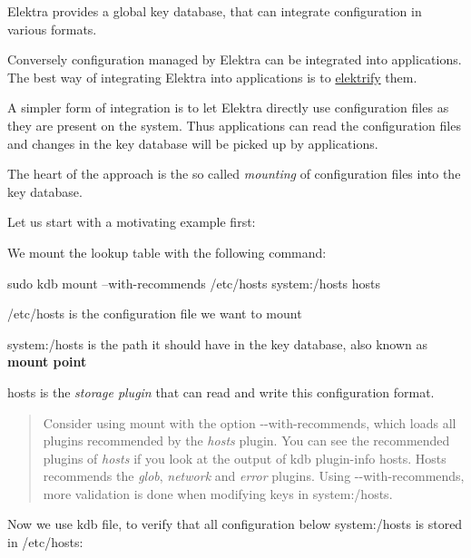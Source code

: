 Elektra provides a global key database, that can integrate configuration in various formats.

Conversely configuration managed by Elektra can be integrated into applications. The best way of integrating Elektra into applications is to \hyperlink{doc_help_elektra-glossary_md}{elektrify} them.

A simpler form of integration is to let Elektra directly use configuration files as they are present on the system. Thus applications can read the configuration files and changes in the key database will be picked up by applications.

The heart of the approach is the so called {\itshape mounting} of configuration files into the key database.

Let us start with a motivating example first\+:

We mount the lookup table with the following command\+:


\begin{DoxyCode}
sudo kdb mount --with-recommends /etc/hosts system:/hosts hosts
\end{DoxyCode}



\begin{DoxyEnumerate}
\item {\ttfamily /etc/hosts} is the configuration file we want to mount
\item {\ttfamily system\+:/hosts} is the path it should have in the key database, also known as {\bfseries mount point}
\item {\ttfamily hosts} is the {\itshape storage plugin} that can read and write this configuration format.
\end{DoxyEnumerate}

\begin{quote}
Consider using mount with the option {\ttfamily -\/-\/with-\/recommends}, which loads all plugins recommended by the {\itshape hosts} plugin. You can see the recommended plugins of {\itshape hosts} if you look at the output of {\ttfamily kdb plugin-\/info hosts}. Hosts recommends the {\itshape glob}, {\itshape network} and {\itshape error} plugins. Using {\ttfamily -\/-\/with-\/recommends}, more validation is done when modifying keys in {\ttfamily system\+:/hosts}. \end{quote}


Now we use {\ttfamily kdb file}, to verify that all configuration below {\ttfamily system\+:/hosts} is stored in {\ttfamily /etc/hosts}\+:


